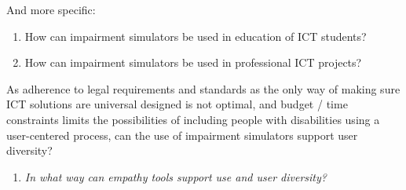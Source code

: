 And more specific:\\
\begin{enumerate}
    \item How can impairment simulators be used in education of ICT students?
    \item How can impairment simulators be used in professional ICT projects?
\end{enumerate}

As adherence to legal requirements and standards as the only way of making sure ICT solutions are universal designed is not optimal, and budget / time constraints limits the possibilities of including people with disabilities using a user-centered process, can the use of impairment simulators support user diversity?

\begin{enumerate}\addtocounter{enumi}{1}
    \item \textit{In what way can empathy tools support use and user diversity?}
\end{enumerate} 

 




